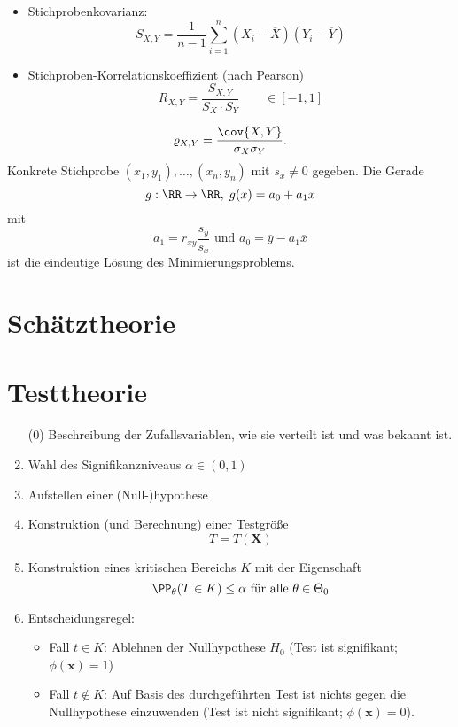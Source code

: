 \begin{itemize}
\item Stichprobenkovarianz:
$$S_{X,Y}=\frac{1}{n-1}\sum_{i=1}^n(X_i - \overline{X})(Y_i-\overline{Y})$$
\item Stichproben-Korrelationskoeffizient (nach Pearson)
$$R_{X,Y}=\frac{S_{X,Y}}{S_X\cdot S_Y} \qquad \in [-1,1]$$
\end{itemize}

$$\varrho_{X,Y}=\frac{\cov{X,Y}}{\sigma_X \sigma_Y}\text{.}$$
Konkrete Stichprobe $(x_1,y_1),\ldots, (x_n,y_n)$ mit $s_x\not = 0$ gegeben. Die Gerade 
$$g: \RR\to \RR, \; g(x)=a_0+a_1x$$
mit
$$a_1 = r_{xy}\frac{s_y}{s_x} \text{ und } a_0 = \overline{y} - a_1 \overline{x}$$
ist die eindeutige Lösung des Minimierungsproblems.

\section{Schätztheorie}

\section{Testtheorie}
\begin{enumerate}
\item[(0)] Beschreibung der Zufallsvariablen, wie sie verteilt ist und was bekannt ist.
\item Wahl des Signifikanzniveaus $\alpha \in (0,1)$
\item Aufstellen einer (Null-)hypothese
\item Konstruktion (und Berechnung) einer Testgröße
$$T=T(\mathbf{X})$$
\item Konstruktion eines kritischen Bereichs $K$ mit der Eigenschaft
$$\PP_\theta (T\in K) \leq \alpha \text{ für alle }\theta \in \Theta_0$$
\item Entscheidungsregel:
\begin{itemize}
\item Fall $t\in K$: Ablehnen der Nullhypothese $H_0$ (Test ist signifikant; $\phi(\mathbf{x})=1$)
\item Fall $t \not \in K$: Auf Basis des durchgeführten Test ist nichts gegen die Nullhypothese einzuwenden (Test ist nicht signifikant; $\phi(\mathbf{x})=0$).
\end{itemize}
\end{enumerate}



